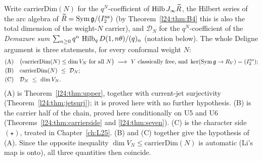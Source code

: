 \begin{remark}\label{l24:rem:arc}
Write $\mathrm{carrierDim}(N)$ for the $q^N$-coefficient of $\operatorname{Hilb}J_\infty\widetilde R$, the
Hilbert series of the arc algebra of $\widetilde R=\operatorname{Sym}\mathfrak g/(I_2^{\mathrm{ns}})$ (by
Theorem~\ref{l24:thm:B4} this is also the total dimension of the weight-$N$ carrier), and $\mathcal D_N$ for the
$q^N$-coefficient of the \emph{Demazure sum} $\sum_{n\ge0}q^n\,\operatorname{Hilb}_qD(1,n\theta)/(q)_n$ (notation below).
The whole Deligne argument is three statements, for every conformal weight $N$:
\begin{align*}
\text{(A)}\quad & \bigl(\mathrm{carrierDim}(N)\le\dim V_N\ \text{for all }N\bigr)\ \Longrightarrow\ V\text{ classically free, and }
\ker(\operatorname{Sym}\mathfrak g\to R_V)=(I_2^{\mathrm{ns}});\\
\text{(B)}\quad & \mathrm{carrierDim}(N)\ \le\ \mathcal D_N;\\
\text{(C)}\quad & \mathcal D_N\ \le\ \dim V_N .
\end{align*}
(A) is Theorem~\ref{l24:thm:upper}, together with current-jet surjectivity (Theorem~\ref{l24:thm:jetsurj}); it is
proved here with no further hypothesis. (B) is the carrier half of the chain, proved here conditionally on U5 and U6
(Theorems~\ref{l24:thm:carrierside} and \ref{l24:thm:seven}). (C) is the character side $(\star)$, treated in
Chapter~\ref{ch:L25}. (B) and (C) together give the hypothesis of (A). Since the opposite inequality
$\dim V_N\le\mathrm{carrierDim}(N)$ is automatic (Li's map is onto), all three quantities then coincide.


\end{remark}
